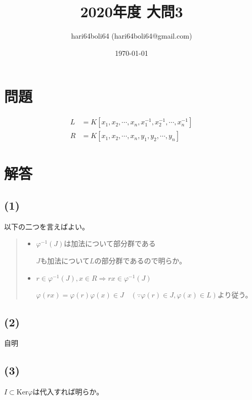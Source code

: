\documentclass[a4paper, 10pt, dvipdfmx]{jlreq}
\begin{document}
\title{2020年度 大問3}
\author{hari64boli64 (hari64boli64@gmail.com)}
\date{\today}
\maketitle


\section{問題}

\begin{align*}
    L & =K[x_1,x_2,\cdots ,x_n, x_1^{-1},x_2^{-1},\cdots ,x_n^{-1}] \\
    R & =K[x_1,x_2,\cdots ,x_n, y_1,y_2,\cdots ,y_n]
\end{align*}

\section{解答}

\subsection*{(1)}

以下の二つを言えばよい。

\begin{quote}
    \begin{itemize}
        \item  $\varphi^{-1}(J)$は加法について部分群である

              $J$も加法について$L$の部分群であるので明らか。

        \item $r \in \varphi^{-1}(J),x \in R \Rightarrow rx \in \varphi^{-1}(J)$

              $\varphi(rx)=\varphi(r)\varphi(x)\in J \quad (\because \varphi(r) \in J , \varphi(x) \in L)$より従う。
    \end{itemize}
\end{quote}


\subsection*{(2)}

自明

\subsection*{(3)}

$I \subset \mathrm{Ker}\varphi$は代入すれば明らか。
\end{document}
